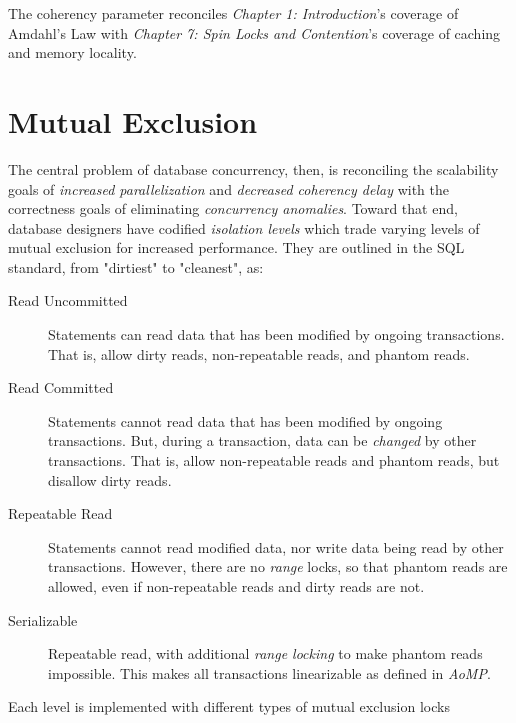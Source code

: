 \documentclass[12pt]{article} %
\begin{document}
The coherency parameter reconciles \textit{Chapter 1: Introduction}'s coverage of Amdahl's Law with \textit{Chapter 7: Spin Locks and Contention}'s coverage of caching and memory locality.

\section{Mutual Exclusion} %

The central problem of database concurrency, then, is reconciling the scalability goals of \textit{increased parallelization} and \textit{decreased coherency delay} with the correctness goals of eliminating \textit{concurrency anomalies}. Toward that end, database designers have codified \textit{isolation levels} which trade varying levels of mutual exclusion for increased performance. They are outlined in the SQL standard, from "dirtiest" to "cleanest", as:
\begin{description}
  \item[Read Uncommitted] Statements can read data that has been modified by ongoing transactions. That is, allow dirty reads, non-repeatable reads, and phantom reads.
  \item[Read Committed] Statements cannot read data that has been modified by ongoing transactions. But, during a transaction, data can be \textit{changed} by other transactions. That is, allow non-repeatable reads and phantom reads, but disallow dirty reads. 
  \item[Repeatable Read] Statements cannot read modified data, nor write data being read by other transactions. However, there are no \textit{range} locks, so that phantom reads are allowed, even if non-repeatable reads and dirty reads are not.
  \item[Serializable] Repeatable read, with additional \textit{range locking} to make phantom reads impossible. This makes all transactions linearizable as defined in \textit{AoMP}.
\end{description}

Each level is implemented with different types of mutual exclusion locks


\end{document}
